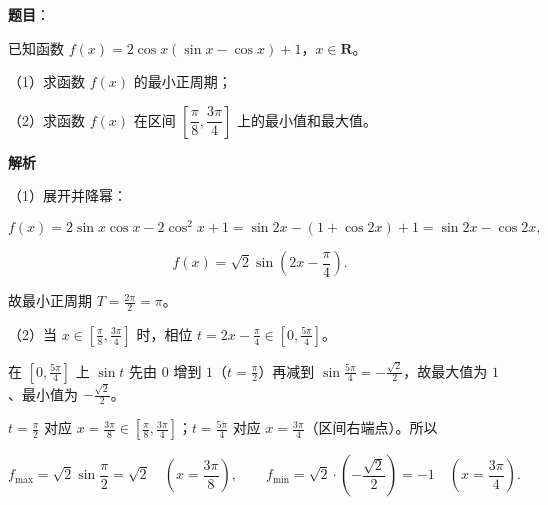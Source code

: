 \begin{answer}

\textbf{题目}：

已知函数 $f(x)=2\cos x(\sin x-\cos x)+1$，$x\in\mathbf{R}$。

（1）求函数 $f(x)$ 的最小正周期；

（2）求函数 $f(x)$ 在区间 $\left[\dfrac{\pi}{8},\dfrac{3\pi}{4}\right]$ 上的最小值和最大值。

\textbf{解析}

（1）展开并降幂：

\nopagebreak[4]
\[f(x)=2\sin x\cos x-2\cos^2x+1=\sin2x-\left(1+\cos2x\right)+1=\sin2x-\cos2x,\]

\nopagebreak[4]
\[f(x)=\sqrt2\sin\left(2x-\frac\pi4\right).\]

故最小正周期 $T=\frac{2\pi}2=\pi$。

（2）当 $x\in\left[\frac\pi8,\frac{3\pi}4\right]$ 时，相位 $t=2x-\frac\pi4\in\left[0,\frac{5\pi}4\right]$。

在 $\left[0,\frac{5\pi}4\right]$ 上 $\sin t$ 先由 $0$ 增到 $1$（$t=\frac\pi2$）再减到 $\sin\frac{5\pi}4=-\frac{\sqrt2}2$，故最大值为 $1$、最小值为 $-\frac{\sqrt2}2$。

$t=\frac\pi2$ 对应 $x=\frac{3\pi}8\in\left[\frac\pi8,\frac{3\pi}4\right]$；$t=\frac{5\pi}4$ 对应 $x=\frac{3\pi}4$（区间右端点）。所以

\nopagebreak[4]
\[f_{\max}=\sqrt2\sin\frac\pi2=\sqrt2\quad\left(x=\frac{3\pi}8\right),\qquad f_{\min}=\sqrt2\cdot\left(-\frac{\sqrt2}2\right)=-1\quad\left(x=\frac{3\pi}4\right).\]


\end{answer}
